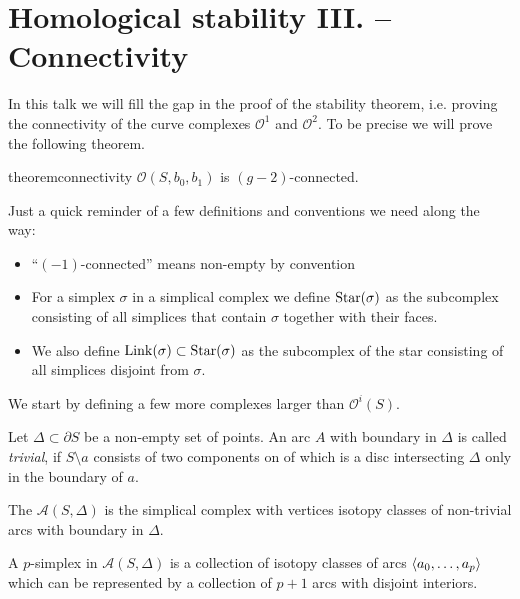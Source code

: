 \section{Homological stability III. -- Connectivity}
In this talk we will fill the gap in the proof of the stability theorem, i.e. proving the connectivity of the curve complexes $\mathcal{O}^1$ and $\mathcal{O}^2$.
To be precise we will prove the following theorem.

\begin{restatable}[{name=[Connectivity]}]{theorem}{connectivity}\label{connec_main}
	$\mathcal{O}(S,b_0,b_1)$ is $(g-2)$-connected.
\end{restatable}

\begin{remark*}
	Just a quick reminder of a few definitions and conventions we need along the way:
	\begin{itemize}[itemsep=0pt]
		\item \enquote{$(-1)$-connected} means non-empty by convention
		\item For a simplex $\sigma$ in a simplical complex we define
		\(
			\Star(\sigma)
		\)
		as the subcomplex consisting of all simplices that contain $\sigma$ together with their faces.
		\item We also define $\Link(\sigma) \subset \Star(\sigma)$ as the subcomplex of the star consisting of all simplices disjoint from $\sigma$.
	\end{itemize}
\end{remark*}

We start by defining a few more complexes larger than $\mathcal{O}^i(S)$.

Let $\Delta \subset \partial S$ be a non-empty set of points.
An arc $A$ with boundary in $\Delta$ is called \emph{trivial}, if $S \setminus a$ consists of two components on of which is a disc intersecting $\Delta$ only in the boundary of $a$.

\begin{definition*}
	The  $\mathcal{A}(S,\Delta)$ is the simplical complex with vertices isotopy classes of non-trivial arcs with boundary in $\Delta$.
\end{definition*}
A $p$-simplex in $\mathcal{A}(S,\Delta)$ is a collection of isotopy classes of arcs $\angbrace*{a_0, \ldots ,a_p}$ which can be represented by a collection of $p+1$ arcs with disjoint interiors.

